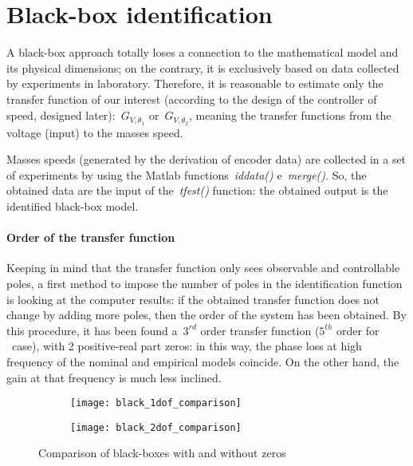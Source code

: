\section{Black-box identification}

A black-box approach totally loses a connection to the mathematical model and its physical dimensions; on the contrary, it is exclusively based on data collected by experiments in laboratory.
Therefore, it is reasonable to estimate only the transfer function of our interest (according to the design of the controller of speed, designed later):~$G_{V,\dot{\theta}_1}$ or~$G_{V,\dot{\theta}_2}$, meaning the transfer functions from the voltage (input) to the masses speed.

Masses speeds (generated by the derivation of encoder data) are collected in a set of experiments by using the Matlab functions~\textit{iddata()} e~\textit{merge()}. So, the obtained data are the input of the~\textit{tfest()} function: the obtained output is the identified black-box model.

\paragraph{Order of the transfer function}

Keeping in mind that the transfer function only sees observable and controllable poles, a first method to impose the number of poles in the identification function is looking at the computer results: if the obtained transfer function does not change by adding more poles, then the order of the system has been obtained.
By this procedure, it has been found a~$3^{rd}$ order transfer function ($5^{th}$ order for \twodof\ case), with 2 positive-real part zeros: in this way, the phase loss at high frequency of the nominal and empirical models coincide. On the other hand, the gain at that frequency is much less inclined.
\begin{figure}[h]
	\centering
	\begin{subfigure}{0.45\columnwidth}
		\texttt{[image: black\_1dof\_comparison]}
	\end{subfigure}
	\begin{subfigure}{0.45\columnwidth}
		\texttt{[image: black\_2dof\_comparison]}
	\end{subfigure}
	\caption{Comparison of black-boxes with and without zeros}
	\label{fig:black_comparison}
\end{figure}

